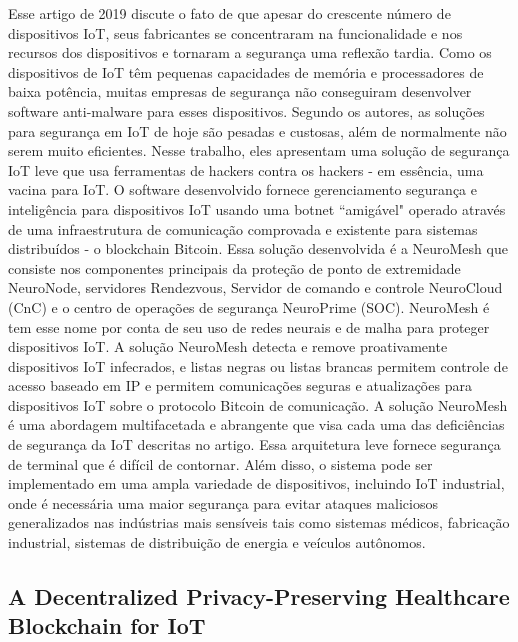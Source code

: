     Esse artigo de 2019 \cite{falco2019neuromesh} discute o fato de que apesar do crescente número de dispositivos IoT, seus fabricantes se concentraram na funcionalidade e nos recursos dos dispositivos e tornaram a segurança uma reflexão tardia. Como os dispositivos de IoT têm pequenas capacidades de memória e processadores de baixa potência, muitas empresas de segurança não conseguiram desenvolver software anti-malware para esses dispositivos. Segundo os autores, as soluções para segurança em IoT de hoje são pesadas e custosas, além de normalmente não serem muito eficientes. Nesse trabalho, eles apresentam uma solução de segurança IoT leve que usa ferramentas de hackers contra os hackers - em essência, uma vacina para IoT. O software desenvolvido fornece gerenciamento segurança e inteligência para dispositivos IoT usando uma botnet “amigável" operado através de uma infraestrutura de comunicação comprovada e existente para sistemas distribuídos - o blockchain Bitcoin. Essa solução desenvolvida é a NeuroMesh que consiste nos componentes principais da proteção de ponto de extremidade NeuroNode, servidores Rendezvous, Servidor de comando e controle NeuroCloud (CnC) e o centro de operações de segurança NeuroPrime (SOC). NeuroMesh é tem esse nome por conta de seu uso de redes neurais e de malha para proteger dispositivos IoT. A solução NeuroMesh detecta e remove proativamente dispositivos IoT infecrados, e listas negras ou listas brancas permitem controle de acesso baseado em IP e permitem comunicações seguras e atualizações para dispositivos IoT sobre o protocolo Bitcoin de comunicação.
    A solução NeuroMesh é uma abordagem multifacetada e abrangente que visa cada uma das deficiências de segurança da IoT descritas no artigo. Essa arquitetura leve fornece segurança de terminal que é difícil de contornar. Além disso, o sistema pode ser implementado em uma ampla variedade de dispositivos, incluindo IoT industrial, onde é necessária uma maior segurança para evitar ataques maliciosos generalizados nas indústrias mais sensíveis tais como sistemas médicos, fabricação industrial, sistemas de distribuição de energia e veículos autônomos.

\subsection{A Decentralized Privacy-Preserving Healthcare Blockchain for IoT}

